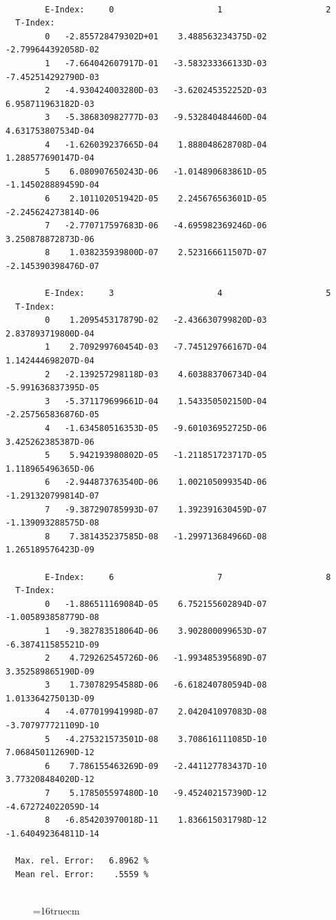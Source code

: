 \documentclass[12pt,dvips]{article}
\begin{document}
\begin{small}\begin{verbatim}

        E-Index:     0                     1                     2
  T-Index:
        0   -2.855728479302D+01    3.488563234375D-02   -2.799644392058D-02
        1   -7.664042607917D-01   -3.583233366133D-03   -7.452514292790D-03
        2   -4.930424003280D-03   -3.620245352252D-03    6.958711963182D-03
        3   -5.386830982777D-03   -9.532840484460D-04    4.631753807534D-04
        4   -1.626039237665D-04    1.888048628708D-04    1.288577690147D-04
        5    6.080907650243D-06   -1.014890683861D-05   -1.145028889459D-04
        6    2.101102051942D-05    2.245676563601D-05   -2.245624273814D-06
        7   -2.770717597683D-06   -4.695982369246D-06    3.250878872873D-06
        8    1.038235939800D-07    2.523166611507D-07   -2.145390398476D-07

        E-Index:     3                     4                     5
  T-Index:
        0    1.209545317879D-02   -2.436630799820D-03    2.837893719800D-04
        1    2.709299760454D-03   -7.745129766167D-04    1.142444698207D-04
        2   -2.139257298118D-03    4.603883706734D-04   -5.991636837395D-05
        3   -5.371179699661D-04    1.543350502150D-04   -2.257565836876D-05
        4   -1.634580516353D-05   -9.601036952725D-06    3.425262385387D-06
        5    5.942193980802D-05   -1.211851723717D-05    1.118965496365D-06
        6   -2.944873763540D-06    1.002105099354D-06   -1.291320799814D-07
        7   -9.387290785993D-07    1.392391630459D-07   -1.139093288575D-08
        8    7.381435237585D-08   -1.299713684966D-08    1.265189576423D-09

        E-Index:     6                     7                     8
  T-Index:
        0   -1.886511169084D-05    6.752155602894D-07   -1.005893858779D-08
        1   -9.382783518064D-06    3.902800099653D-07   -6.387411585521D-09
        2    4.729262545726D-06   -1.993485395689D-07    3.352589865190D-09
        3    1.730782954588D-06   -6.618240780594D-08    1.013364275013D-09
        4   -4.077019941998D-07    2.042041097083D-08   -3.707977721109D-10
        5   -4.275321573501D-08    3.708616111085D-10    7.068450112690D-12
        6    7.786155463269D-09   -2.441127783437D-10    3.773208484020D-12
        7    5.178505597480D-10   -9.452402157390D-12   -4.672724022059D-14
        8   -6.854203970018D-11    1.836615031798D-12   -1.640492364811D-14

  Max. rel. Error:   6.8962 %
  Mean rel. Error:    .5559 %


\end{verbatim}\end{small}
\begin{figure} \label{2.1.8}
\epsfxsize=16truecm
\end{figure}
\newpage
\end{document}
